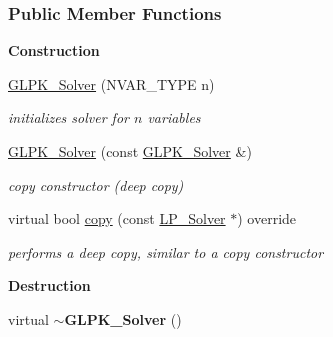 \subsubsection*{Public Member Functions}
\begin{Indent}\textbf{ Construction}\par
\begin{DoxyCompactItemize}
\item 
\mbox{\label{group___c_l_s_solvers_a10b3981d1807e86315318505ae0faeba}} 
\hyperlink{group___c_l_s_solvers_a10b3981d1807e86315318505ae0faeba}{G\+L\+P\+K\+\_\+\+Solver} (N\+V\+A\+R\+\_\+\+T\+Y\+PE n)
\begin{DoxyCompactList}\small\item\em initializes solver for $ n $ variables \end{DoxyCompactList}\item 
\mbox{\label{group___c_l_s_solvers_acdba8634513aafff25e17d42e3f8261b}} 
\hyperlink{group___c_l_s_solvers_acdba8634513aafff25e17d42e3f8261b}{G\+L\+P\+K\+\_\+\+Solver} (const \hyperlink{group___c_l_s_solvers_class_l_p___solvers_1_1_g_l_p_k___solver}{G\+L\+P\+K\+\_\+\+Solver} \&)
\begin{DoxyCompactList}\small\item\em copy constructor (deep copy) \end{DoxyCompactList}\item 
virtual bool \hyperlink{group___c_l_s_solvers_a43a745172366a1dfd893dee00f0ce0fb}{copy} (const \hyperlink{group___c_l_s_solvers_class_l_p___solvers_1_1_l_p___solver}{L\+P\+\_\+\+Solver} $\ast$) override
\begin{DoxyCompactList}\small\item\em performs a deep copy, similar to a copy constructor \end{DoxyCompactList}\end{DoxyCompactItemize}
\end{Indent}
\begin{Indent}\textbf{ Destruction}\par
\begin{DoxyCompactItemize}
\item 
\mbox{\label{group___c_l_s_solvers_a5712c834300cea2063aa932ad8a817d7}} 
virtual {\bfseries $\sim$\+G\+L\+P\+K\+\_\+\+Solver} ()
\end{DoxyCompactItemize}
\end{Indent}
